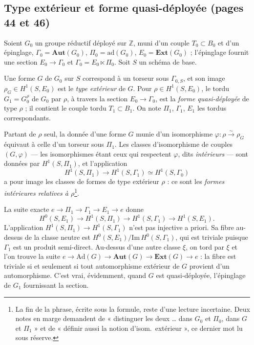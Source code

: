 \documentclass[11pt,a4paper]{article}
\begin{document}
\subsection*{Type extérieur et forme quasi-déployée (pages 44 et 46)}

Soient $G_0$ un groupe réductif déployé sur $\mathbb{Z}$, muni d'un couple
$T_0 \subset B_0$ et d'un épinglage, $\Gamma_0 = \mathbf{Aut}(G_0)$, $\Pi_0 =
\mathrm{ad}(G_0)$, $E_0 = \mathbf{Ext}(G_0)$ ; l'épinglage fournit une section
$E_0 \to \Gamma_0$ et $\Gamma_0 = E_0 \ltimes \Pi_0$. Soit $S$ un schéma de base.

Une forme $G$ de $G_0$ sur $S$ correspond à un torseur sous $\Gamma_{0,S}$, et son
image $\rho_G \in H^1(S, E_0)$ est le \emph{type extérieur} de $G$. Pour
$\rho \in H^1(S,E_0)$, le tordu $G_1 = G_0^{\rho}$ de $G_0$ par $\rho$, à travers la
section $E_0 \to \Gamma_0$, est la \emph{forme quasi-déployée} de type $\rho$ ; il
contient le couple tordu $T_1 \subset B_1$. On note $\Pi_1$, $\Gamma_1$, $E_1$ les
tordus correspondants.

Partant de $\rho$ seul, la donnée d'une forme $G$ munie d'un isomorphisme
$\varphi : \rho \xrightarrow{\sim} \rho_G$ équivaut à celle d'un torseur sous
$\Pi_1$. Les classes d'isomorphisme de couples $(G,\varphi)$ — les isomorphismes
étant ceux qui respectent $\varphi$, dits \emph{intérieurs} — sont données par
$H^1(S,\Pi_1)$, et l'application
\[
H^1(S, \Pi_1) \longrightarrow H^1(S, \Gamma_1) \simeq H^1(S, \Gamma_0)
\]
a pour image les classes de formes de type extérieur $\rho$ : ce sont les
\emph{formes intérieures relatives à $\rho$}\footnote{La fin de la phrase,
écrite sous la formule, reste d'une lecture incertaine. Deux notes en marge
demandent de « distinguer les deux … dans $G_0$ et $\Pi_0$, dans $G$ et
$\Pi_1$ » et de « définir aussi la notion d'isom.\ extérieur », ce dernier mot lu
sous réserve.}.

La suite exacte $e \to \Pi_1 \to \Gamma_1 \to E_1 \to e$ donne
\[
H^0(S, E_1) \to H^1(S, \Pi_1) \to H^1(S, \Gamma_1) \to H^1(S, E_1).
\]
L'application $H^1(S,\Pi_1) \to H^1(S,\Gamma_1)$ n'est pas injective a priori. Sa
fibre au-dessus de la classe neutre est $H^0(S,E_1)/\mathrm{Im}\,H^0(S,\Gamma_1)$,
qui est triviale puisque $\Gamma_1$ est un produit semi-direct. Au-dessus d'une
autre classe $\xi$, on tord par $\xi$ et l'on trouve la suite
$e \to \mathrm{Ad}(G) \to \mathbf{Aut}(G) \to \mathbf{Ext}(G) \to e$ : la fibre est
triviale si et seulement si tout automorphisme extérieur de $G$ provient d'un
automorphisme. C'est vrai, évidemment, quand $G$ est quasi-déployée, l'épinglage
de $G_1$ fournissant la section.
\end{document}
